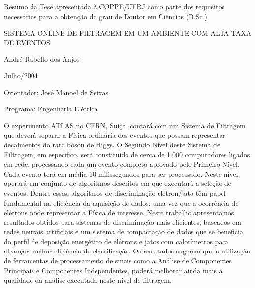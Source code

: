 \newenvironment{summary}[1]{%
\begin{minipage}{\linewidth}%
\newcommand{\saveparameter}{\baselinestretch}%
\renewcommand{\baselinestretch}{#1}%
\normalsize}%
{%
\renewcommand{\baselinestretch}{\saveparameter}%
\end{minipage}%
}

\noindent
Resumo da Tese apresentada à COPPE/UFRJ como parte dos requisitos necessários
para a obtenção do grau de Doutor em Ciências (D.Sc.)

\vspace{1.5cm}

\begin{center}
SISTEMA ONLINE DE FILTRAGEM EM UM AMBIENTE COM ALTA TAXA DE EVENTOS
\vspace{1cm}

André Rabello dos Anjos
\vspace{1cm}

Julho/2004
\end{center}
\vspace{1.5cm}

\noindent
Orientador: José Manoel de Seixas
\vspace{1.5cm}

\noindent
Programa: Engenharia Elétrica
\vspace{2cm}

\begin{summary}{1.2}
O experimento ATLAS no CERN, Suíça, contará com um Sistema de Filtragem que
deverá separar a Física ordinária dos eventos que possam representar
decaimentos do raro bóson de Higgs. O Segundo Nível deste Sistema de
Filtragem, em específico, será constituído de cerca de 1.000 computadores
ligados em rede, processando cada um evento completo aprovado pelo Primeiro
Nível. Cada evento terá em média 10 milissegundos para ser processado.  Neste
nível, operará um conjunto de algoritmos descritos em  que
executará a seleção de eventos. Dentre esses, algoritmos de discriminação
elétron/jato têm papel fundamental na eficiência da aquisição de dados, uma
vez que a ocorrência de elétrons pode representar a Física de interesse. Neste
trabalho apresentamos resultados obtidos para sistemas de discriminação mais
eficientes, baseados em redes neurais artificiais e um sistema de compactação
de dados que se beneficia do perfil de deposição energético de elétrons e
jatos com calorímetros para alcançar melhor eficiência de classificação. Os
resultados sugerem que a utilização de ferramentas de processamento de sinais
como a Análise de Componentes Principais e Componentes Independentes, poderá
melhorar ainda mais a qualidade da análise executada neste nível de filtragem.
\end{summary}

